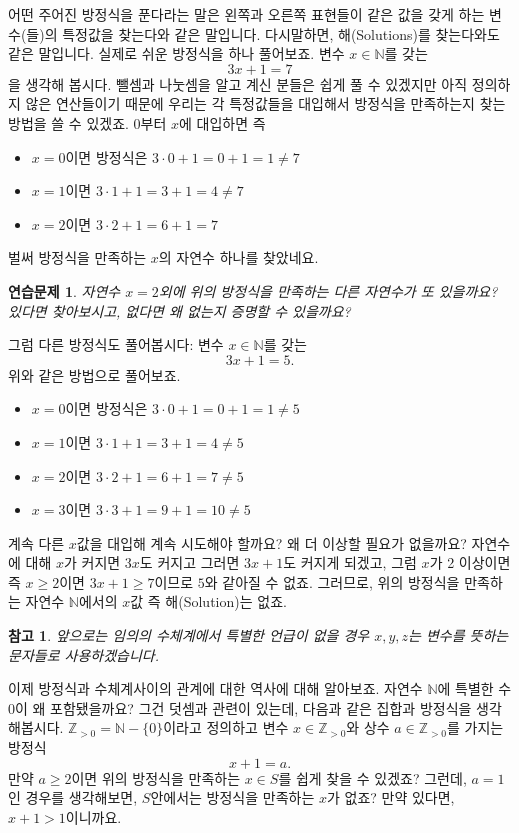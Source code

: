 \documentclass[a4paper, 11pt]{report}
\renewcommand{\<}{\langle}
\renewcommand{\>}{\rangle}
\newtheorem{remark}[thm]{참고}
\newtheorem{exercise}[thm]{연습문제}
\begin{document}
어떤 주어진 방정식을 푼다라는 말은 왼쪽과 오른쪽 표현들이 같은 값을 갖게 하는 변수(들)의
특정값을 찾는다와 같은 말입니다. 다시말하면, 해(Solutions)를 찾는다와도 같은 말입니다.
실제로 쉬운 방정식을 하나 풀어보죠. 변수 $x \in \mathbb{N}$를 갖는
$$
3x + 1 = 7
$$
을 생각해 봅시다. 뺄셈과 나눗셈을 알고 계신 분들은 쉽게 풀 수 있겠지만 아직 정의하지 않은 
연산들이기 때문에 우리는 각 특정값들을 대입해서 방정식을 만족하는지 찾는 방법을 쓸 수 있겠죠.
$0$부터 $x$에 대입하면 즉 
\begin{itemize}
  \item $x = 0$이면 방정식은 $3\cdot 0 + 1 = 0 + 1 = 1 \neq 7$
  \item $x = 1$이면 $3\cdot 1 + 1 = 3 + 1 = 4 \neq 7$
  \item $x = 2$이면 $3\cdot 2 + 1 = 6 + 1 = 7$
\end{itemize}
벌써 방정식을 만족하는 $x$의 자연수 하나를 찾았네요.

\begin{exercise}
  자연수 $x = 2$외에 위의 방정식을 만족하는 다른 자연수가 또 있을까요? 있다면 찾아보시고,
  없다면 왜 없는지 증명할 수 있을까요?
\end{exercise}

그럼 다른 방정식도 풀어봅시다: 변수 $x \in \mathbb{N}$를 갖는
$$
3x + 1 = 5.
$$
위와 같은 방법으로 풀어보죠.
\begin{itemize}
  \item $x = 0$이면 방정식은 $3\cdot 0 + 1 = 0 + 1 = 1 \neq 5$
  \item $x = 1$이면 $3\cdot 1 + 1 = 3 + 1 = 4 \neq 5$
  \item $x = 2$이면 $3\cdot 2 + 1 = 6 + 1 = 7 \neq 5$
  \item $x = 3$이면 $3\cdot 3 + 1 = 9 + 1 = 10 \neq 5$
\end{itemize}
계속 다른 $x$값을 대입해 계속 시도해야 할까요? 왜 더 이상할 필요가 없을까요? 자연수에 대해 $x$가 커지면
$3x$도 커지고 그러면 $3x+1$도 커지게 되겠고, 그럼 $x$가 2 이상이면 즉 $x \ge 2$이면 $3x + 1 \ge 7$이므로
$5$와 같아질 수 없죠. 그러므로, 위의 방정식을 만족하는 자연수 $\mathbb{N}$에서의 $x$값 즉 해(Solution)는 없죠.

\begin{remark}
  앞으로는 임의의 수체계에서 특별한 언급이 없을 경우 $x, y, z$는 변수를 뜻하는 문자들로 사용하겠습니다. 
\end{remark}

\iffalse

이제 방정식과 수체계사이의 관계에 대한 역사에 대해 알아보죠. 자연수 $\mathbb{N}$에 특별한 수 $0$이 왜 
포함됐을까요? 그건 덧셈과 관련이 있는데, 다음과 같은 집합과 방정식을 생각해봅시다. $\mathbb{Z}_{>0} = \mathbb{N} - \{0\}$이라고
정의하고 변수 $x \in \mathbb{Z}_{>0}$와 상수 $a \in \mathbb{Z}_{>0}$를 가지는 방정식
$$
x + 1 = a.
$$
만약 $a \ge 2$이면 위의 방정식을 만족하는 $x \in S$를 쉽게 찾을 수 있겠죠? 그런데, $a = 1$인 경우를 생각해보면,
$S$안에서는 방정식을 만족하는 $x$가 없죠? 만약 있다면, $x + 1 > 1$이니까요. 
\end{document}
